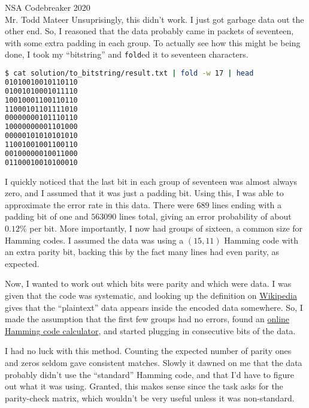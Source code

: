 \documentclass{letter}
\begin{document}
\begin{letter}{NSA Codebreaker 2020\\Mr. Todd Mateer}
\newpage
Unsuprisingly, this didn't work. I just got garbage data out the other end. So,
I reasoned that the data probably came in packets of seventeen, with some extra
padding in each group. To actually see how this might be being done, I took my
``bitstring'' and \texttt{fold}ed it to seventeen characters.
\begin{lstlisting}[language=Bash]
$ cat solution/to_bitstring/result.txt | fold -w 17 | head
01010010010110110
01001010001011110
10010001100110110
11000101101111010
00000000101110110
10000000001101000
00000101010101010
11001001001100110
00100000010011000
01100010010100010
\end{lstlisting}


I quickly noticed that the last bit in each group of seventeen was almost always
zero, and I assumed that it was just a padding bit. Using this, I was able to
approximate the error rate in this data. There were \(\num{689}\) lines ending
with a padding bit of one and \(\num{563090}\) lines total, giving an error
probability of about \(\num{0,12}\%\) per bit. More importantly, I now had
groups of sixteen, a common size for Hamming codes. I assumed the data was using
a \((15,11)\) Hamming code with an extra parity bit, backing this by the fact
many lines had even parity, as expected.


Now, I wanted to work out which bits were parity and which were data. I was
given that the code was systematic, and looking up the definition on
\href{https://en.wikipedia.org/wiki/Systematic_code}{Wikipedia} gives that the
``plaintext'' data appears inside the encoded data somewhere. So, I made the
assumption that the first few groups had no errors, found an
\href{http://www.ecs.umass.edu/ece/koren/FaultTolerantSystems/simulator/Hamming/HammingCodes.html}
{online Hamming code calculator}, and started plugging in consecutive bits of
the data.


I had no luck with this method. Counting the expected number of parity ones and
zeros seldom gave consistent matches. Slowly it dawned on me that the data
probably didn't use the ``standard'' Hamming code, and that I'd have to figure
out what it was using. Granted, this makes sense since the task asks for the
parity-check matrix, which wouldn't be very useful unless it was non-standard.



\end{letter}
\end{document}
